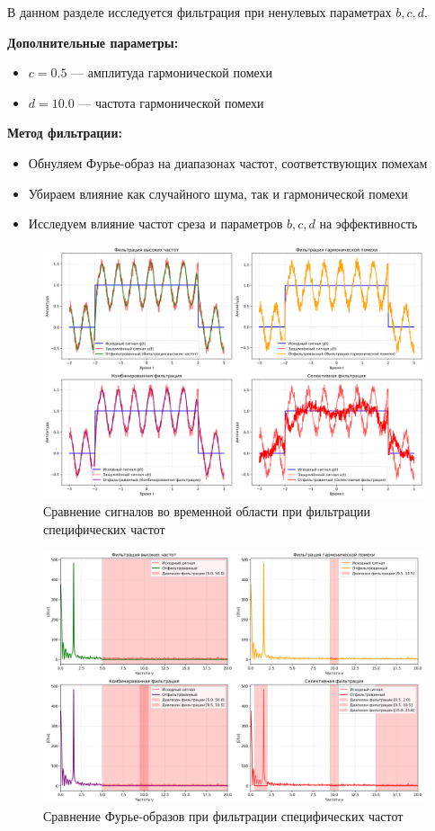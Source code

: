 В данном разделе исследуется фильтрация при ненулевых параметрах $b, c, d$.

\textbf{Дополнительные параметры:}
\begin{itemize}
    \item $c = 0.5$ — амплитуда гармонической помехи
    \item $d = 10.0$ — частота гармонической помехи
\end{itemize}

\textbf{Метод фильтрации:}
\begin{itemize}
    \item Обнуляем Фурье-образ на диапазонах частот, соответствующих помехам
    \item Убираем влияние как случайного шума, так и гармонической помехи
    \item Исследуем влияние частот среза и параметров $b, c, d$ на эффективность
\end{itemize}

\begin{figure}[H]
\centering
\includegraphics[width=\textwidth]{images/task1/specific_freq_filter_time_domain.png}
\caption{Сравнение сигналов во временной области при фильтрации специфических частот}
\end{figure}

\begin{figure}[H]
\centering
\includegraphics[width=\textwidth]{images/task1/specific_freq_filter_freq_domain.png}
\caption{Сравнение Фурье-образов при фильтрации специфических частот}
\end{figure}

